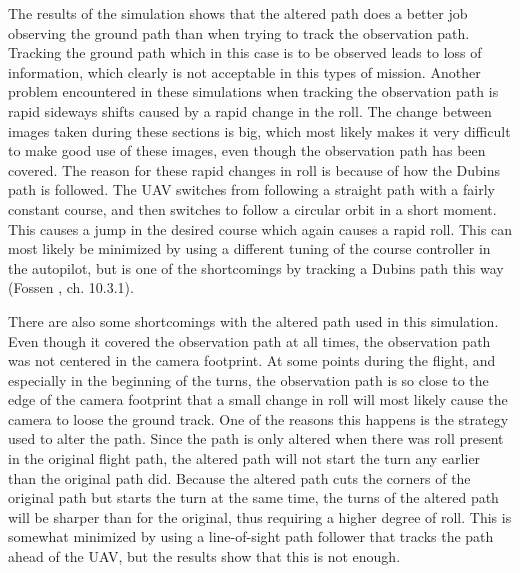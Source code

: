 The results of the simulation shows that the altered path does a better job observing the ground path than when trying to track the observation path. Tracking the ground path which in this case is to be observed leads to loss of information, which clearly is not acceptable in this types of mission. Another problem encountered in these simulations when tracking the observation path is rapid sideways shifts caused by a rapid change in the roll. The change between images taken during these sections is big, which most likely makes it very difficult to make good use of these images, even though the observation path has been covered. The reason for these rapid changes in roll is because of how the Dubins path is followed. The UAV switches from following a straight path with a fairly constant course, and then switches to follow a circular orbit in a short moment. This causes a jump in the desired course which again causes a rapid roll. This can most likely be minimized by using a different tuning of the course controller in the autopilot, but is one of the shortcomings by tracking a Dubins path this way (Fossen \cite{fartoyFOSSEN}, ch. 10.3.1). 

There are also some shortcomings with the altered path used in this simulation. Even though it covered the observation path at all times, the observation path was not centered in the camera footprint. At some points during the flight, and especially in the beginning of the turns, the observation path is so close to the edge of the camera footprint that a small change in roll will most likely cause the camera to loose the ground track. One of the reasons this happens is the strategy used to alter the path. Since the path is only altered when there was roll present in the original flight path, the altered path will not start the turn any earlier than the original path did. Because the altered path cuts the corners of the original path but starts the turn at the same time, the turns of the altered path will be sharper than for the original, thus requiring a higher degree of roll. This is somewhat minimized by using a line-of-sight path follower that tracks the path ahead of the UAV, but the results show that this is not enough.


